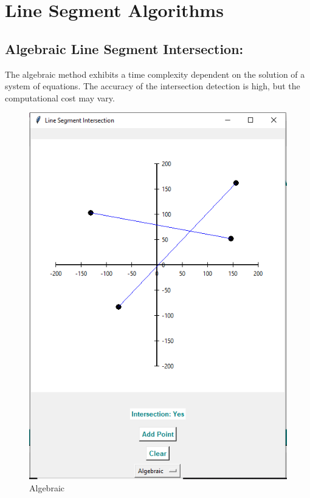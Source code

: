\section{Line Segment Algorithms}

\subsection{\textbf{Algebraic Line Segment Intersection:}}

The algebraic method exhibits a time complexity dependent on the solution of a system of equations. The accuracy of the intersection detection is high, but the computational cost may vary.

\begin{figure}[h]
    \centering
    \includegraphics[width=1\linewidth]{algebraic.PNG}
    \caption{Algebraic}
    \label{fig:algebraic}
\end{figure}
